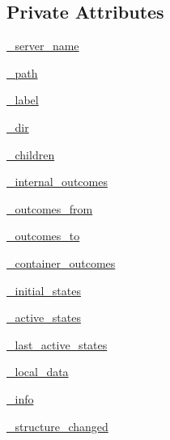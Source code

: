 \subsection*{Private Attributes}
\begin{DoxyCompactItemize}
\item 
\hyperlink{classsmacc__viewer_1_1ContainerNode_aac5daf1b3edc6c4fad17b72a6e491066}{\+\_\+server\+\_\+name}
\item 
\hyperlink{classsmacc__viewer_1_1ContainerNode_ae600e450e4ccfa137937076c391ded72}{\+\_\+path}
\item 
\hyperlink{classsmacc__viewer_1_1ContainerNode_ae088542666a3b43101b59f2e03d22e8b}{\+\_\+label}
\item 
\hyperlink{classsmacc__viewer_1_1ContainerNode_a2a6efbc2a25f65b830415ee994408ca0}{\+\_\+dir}
\item 
\hyperlink{classsmacc__viewer_1_1ContainerNode_a886cb99815f827d99bcd4c3e341284f1}{\+\_\+children}
\item 
\hyperlink{classsmacc__viewer_1_1ContainerNode_a0cecef41d6d1036c4716d1143479743a}{\+\_\+internal\+\_\+outcomes}
\item 
\hyperlink{classsmacc__viewer_1_1ContainerNode_ad0975f45567a6339b66516548e67385a}{\+\_\+outcomes\+\_\+from}
\item 
\hyperlink{classsmacc__viewer_1_1ContainerNode_a26f35e2c039a0a7d5f68a5abfc918627}{\+\_\+outcomes\+\_\+to}
\item 
\hyperlink{classsmacc__viewer_1_1ContainerNode_afc173014e336c7c3ab6a5d2dd1798d63}{\+\_\+container\+\_\+outcomes}
\item 
\hyperlink{classsmacc__viewer_1_1ContainerNode_a3d5c9521ab4377e7b94e437d4f7e5a83}{\+\_\+initial\+\_\+states}
\item 
\hyperlink{classsmacc__viewer_1_1ContainerNode_ad4607ee25bd9dd1f1c54ac72ca1ba5aa}{\+\_\+active\+\_\+states}
\item 
\hyperlink{classsmacc__viewer_1_1ContainerNode_a627a2895916d1815096914f67a612af2}{\+\_\+last\+\_\+active\+\_\+states}
\item 
\hyperlink{classsmacc__viewer_1_1ContainerNode_af401127311993eaf8cc2b9e631634320}{\+\_\+local\+\_\+data}
\item 
\hyperlink{classsmacc__viewer_1_1ContainerNode_a1e3dcba4beb3738d72e57805b7d2474b}{\+\_\+info}
\item 
\hyperlink{classsmacc__viewer_1_1ContainerNode_a8d17a3a75ce519ef442b9bc94a801130}{\+\_\+structure\+\_\+changed}
\end{DoxyCompactItemize}


